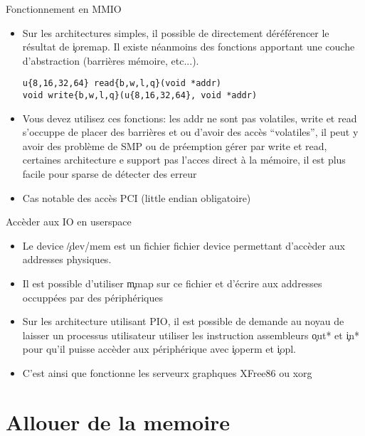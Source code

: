 \begin{frame}[fragile=singleslide]{Fonctionnement en MMIO}
  \begin{itemize} 
\item  Sur les  architectures  simples, il  possible de  directement
    déréférencer le résultat de  \c{ioremap}.  Il existe néanmoins des
    fonctions apportant  une couche d'abstraction  (barrières mémoire,
    etc...).
    \begin{lstlisting}  
u{8,16,32,64} read{b,w,l,q}(void *addr)
void write{b,w,l,q}(u{8,16,32,64}, void *addr)
    \end{lstlisting} 
  \item  Vous devez  utilisez  ces  fonctions: les  addr  ne sont  pas
    volatiles, write et  read s'occuppe de placer des  barrières et ou
    d'avoir des accès  ``volatiles'', il peut y avoir  des problème de
    SMP  ou   de  préemption  gérer  par  write   et  read,  certaines
    architecture e  support pas  l'acces direct à  la mémoire,  il est
    plus facile pour sparse de détecter des erreur
  \item Cas notable des accès PCI (little endian obligatoire)
  \end{itemize} 
\end{frame} 


\begin{frame}[fragile=singleslide]{Accèder aux IO en userspace}
  \begin{itemize} 
  \item  Le   device  \c{/dev/mem}  est  un   fichier  fichier  device
    permettant d'accèder aux addresses physiques.
  \item Il est possible d'utiliser \c{mmap} sur ce fichier et d'écrire
    aux addresses occuppées par des périphériques
  \item Sur les architecture utilisant PIO, il est possible de demande
    au  noyau  de  laisser   un  processus  utilisateur  utiliser  les
    instruction  assembleurs  \c{out*} et  \c{in*}  pour qu'il  puisse
    accèder aux périphérique avec \c{ioperm} et \c{iopl}.
  \item C'est  ainsi que fonctionne les serveurx  graphques XFree86 ou
    xorg
  \end{itemize} 
\end{frame} 


\section{Allouer de la memoire}

